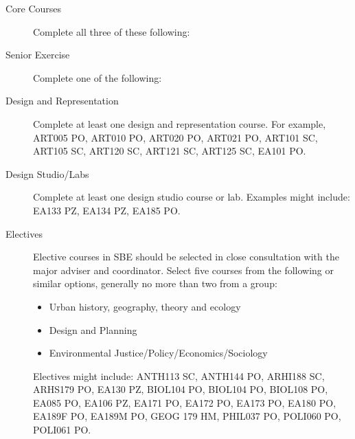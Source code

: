 \documentclass{article}\usepackage[]{graphicx}\usepackage[]{xcolor}
\newenvironment{itemize*}%
  {\begin{itemize}%
    \setlength{\itemsep}{0pt}%
    \setlength{\parskip}{0pt}}%
  {\end{itemize}}
\begin{document}
\begin{description}

  \item[Core Courses] Complete all three of these following:
  

  \item[Senior Exercise] Complete one of the following:
  


\item[Design and Representation] Complete at least one design and representation course. For example, ART005 PO, ART010 PO, ART020 PO, ART021 PO, ART101 SC, ART105 SC, ART120 SC, ART121 SC, ART125 SC, EA101 PO.



\item[Design Studio/Labs] Complete at least one design studio course or lab. Examples might include: EA133 PZ, EA134 PZ, EA185 PO.



\item[Electives] Elective courses in SBE should be selected in close consultation with the major adviser and coordinator. Select five courses from the following or similar options, generally no more than two from a group:
\begin{itemize}
  \item Urban history, geography, theory and ecology
  \item Design and Planning
  \item Environmental Justice/Policy/Economics/Sociology
\end{itemize}

\noindent Electives might include: ANTH113 SC, ANTH144 PO, ARHI188 SC, ARHS179 PO, EA130 PZ, BIOL104 PO, BIOL104 PO, BIOL108 PO, EA085 PO, EA106 PZ, EA171 PO, EA172 PO, EA173 PO, EA180 PO, EA189F PO, EA189M PO, GEOG 179 HM, PHIL037 PO, POLI060 PO, POLI061 PO.



\end{description}
\end{document}
